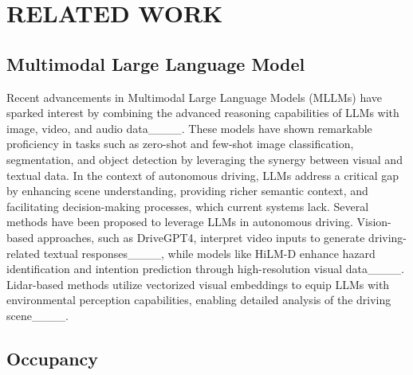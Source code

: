 \section{RELATED WORK}
\subsection{Multimodal Large Language Model}

Recent advancements in Multimodal Large Language Models (MLLMs) have sparked interest by combining the advanced reasoning capabilities of LLMs with image, video, and audio data____. These models have shown remarkable proficiency in tasks such as zero-shot and few-shot image classification, segmentation, and object detection by leveraging the synergy between visual and textual data. In the context of autonomous driving, LLMs address a critical gap by enhancing scene understanding, providing richer semantic context, and facilitating decision-making processes, which current systems lack.
Several methods have been proposed to leverage LLMs in autonomous driving. Vision-based approaches, such as DriveGPT4, interpret video inputs to generate driving-related textual responses____, while models like HiLM-D enhance hazard identification and intention prediction through high-resolution visual data____. Lidar-based methods utilize vectorized visual embeddings to equip LLMs with environmental perception capabilities, enabling detailed analysis of the driving scene____.



\subsection{Occupancy}

